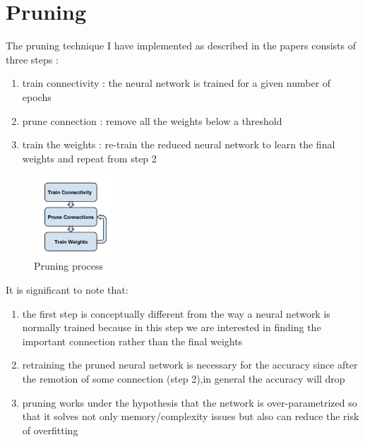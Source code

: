 \documentclass[journal]{vgtc}                %
\begin{document}
\section{Pruning}
The pruning technique I have implemented as described in the papers consists of three steps :
\begin{enumerate}
\item train connectivity : the neural network is trained for a given number of epochs
\item prune connection : remove all the weights below a threshold
\item train the weights : re-train the reduced neural network to learn the final weights and repeat from step 2
\end{enumerate}
\begin{figure}[H]
	\includegraphics[width=30mm,scale=0.5]{prune-view}
	\caption{Pruning process}
\end{figure}
It is significant to note that:
\begin{enumerate}
\item the first step is conceptually different from the way a neural network is normally trained because in this step we are interested in finding the important connection rather than the final weights
\item retraining the pruned neural network is necessary for the accuracy since after the remotion of some connection (step 2),in general the accuracy will drop
\item pruning works under the hypothesis that the network is over-parametrized so that it solves not only memory/complexity issues but also can reduce the risk of overfitting
\end{enumerate}
\end{document}
